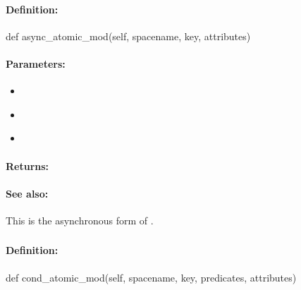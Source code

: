 \paragraph{Definition:}
\begin{pythoncode}
def async_atomic_mod(self, spacename, key, attributes)
\end{pythoncode}

\paragraph{Parameters:}
\begin{itemize}[noitemsep]
\item {}\\

\item {}\\

\item {}\\

\end{itemize}

\paragraph{Returns:}


\paragraph{See also:}  This is the asynchronous form of .

\pagebreak
\subsubsection{}
\label{api:python:cond_atomic_mod}


\paragraph{Definition:}
\begin{pythoncode}
def cond_atomic_mod(self, spacename, key, predicates, attributes)
\end{pythoncode}

